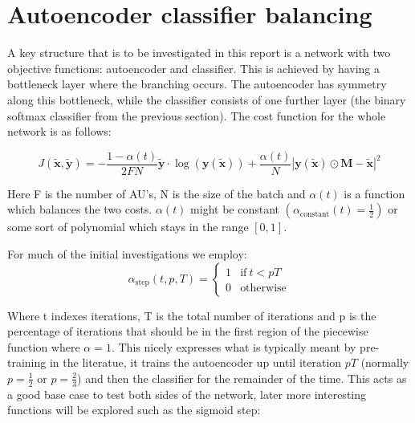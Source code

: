   \section{Autoencoder classifier balancing} \label{sec:autoalpha}
    A key structure that is to be investigated in this report is a network with two objective functions:
    autoencoder and classifier. This is achieved by having a bottleneck layer where the branching occurs.
    The autoencoder has symmetry along this bottleneck, while the classifier consists of one further layer
    (the binary softmax classifier from the previous section). The cost function for the whole network is as follows:

    \begin{equation}
        J(\tilde{\mathbf{x}},\tilde{\mathbf{y}}) = -\frac{1-\alpha(t)}{2FN}\tilde{\mathbf{y}}\cdot\log(\mathbf{y}(\tilde{\mathbf{x}}))
        + \frac{\alpha(t)}{N}\left |\mathbf{y}(\tilde{\mathbf{x}}) \odot \mathbf{M}-\tilde{\mathbf{x}}\right | ^2
    \end{equation}

    Here F is the number of AU's, N is the size of the batch and $\alpha(t)$ is a
    function which balances the two costs. $\alpha(t)$ might be constant $\left ( \alpha_{\text{constant}}(t)=\frac{1}{2} \right )$ or
    some sort of polynomial which stays in the range $[0,1]$.

    For much of the initial investigations we employ:
    \begin{equation}
    \alpha_{\text{step}}(t,p,T) =
    \begin{cases}
      1           & \text{if}\ t<pT \\
      0           & \text{otherwise}
    \end{cases}
    \end{equation}

    Where t indexes iterations, T is the total number of iterations and p is the
    percentage of iterations that should be in the first region of the piecewise function
    where $\alpha=1$.
    This nicely expresses what is typically meant by pre-training in the literatue, it trains
    the autoencoder up until iteration $pT$ (normally $p=\frac{1}{2}$ or $p=\frac{2}{3}$) and then the classifier for the remainder of the time.
    This acts as a good base case to test both sides of the network, later more interesting
    functions will be explored such as the sigmoid step:

